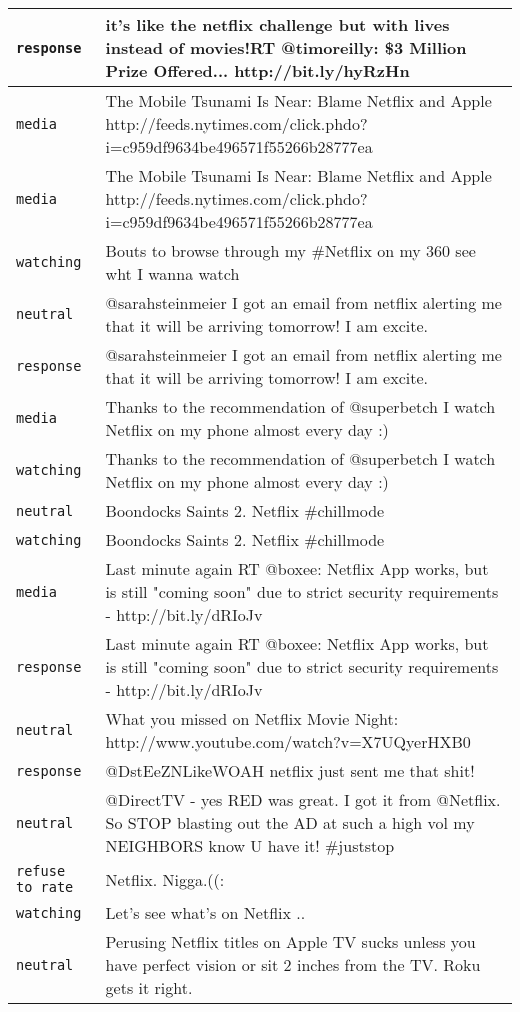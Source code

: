 \begin{center}
\begin{longtable}{|l|p{120mm}|}
      \tabularnewline\hline
         \texttt{response} & it's like the netflix challenge but with lives instead of movies!RT @timoreilly: \$3 Million Prize Offered... http://bit.ly/hyRzHn
      \tabularnewline\hline
         \texttt{media} & The Mobile Tsunami Is Near: Blame Netflix and Apple http://feeds.nytimes.com/click.phdo?i=c959df9634be496571f55266b28777ea
      \tabularnewline\hline
         \texttt{media} & The Mobile Tsunami Is Near: Blame Netflix and Apple http://feeds.nytimes.com/click.phdo?i=c959df9634be496571f55266b28777ea
      \tabularnewline\hline
         \texttt{watching} & Bouts to browse through my \#Netflix on my 360 see wht I wanna watch
      \tabularnewline\hline
         \texttt{neutral} & @sarahsteinmeier I got an email from netflix alerting me that it will be arriving tomorrow! I am excite.
      \tabularnewline\hline
         \texttt{response} & @sarahsteinmeier I got an email from netflix alerting me that it will be arriving tomorrow! I am excite.
      \tabularnewline\hline
         \texttt{media} & Thanks to the recommendation of @superbetch I watch Netflix on my phone almost every day :)
      \tabularnewline\hline
         \texttt{watching} & Thanks to the recommendation of @superbetch I watch Netflix on my phone almost every day :)
      \tabularnewline\hline
         \texttt{neutral} & Boondocks Saints 2. Netflix \#chillmode
      \tabularnewline\hline
         \texttt{watching} & Boondocks Saints 2. Netflix \#chillmode
      \tabularnewline\hline
         \texttt{media} & Last minute again RT @boxee: Netflix App works, but is still "coming soon" due to strict security requirements - http://bit.ly/dRIoJv
      \tabularnewline\hline
         \texttt{response} & Last minute again RT @boxee: Netflix App works, but is still "coming soon" due to strict security requirements - http://bit.ly/dRIoJv
      \tabularnewline\hline
         \texttt{neutral} & What you missed on Netflix Movie Night: http://www.youtube.com/watch?v=X7UQyerHXB0
      \tabularnewline\hline
         \texttt{response} & @DstEeZNLikeWOAH netflix just sent me that shit!
      \tabularnewline\hline
         \texttt{neutral} & @DirectTV - yes RED was great. I got it from @Netflix. So STOP blasting out the AD at such a high vol my NEIGHBORS know U have it! \#juststop
      \tabularnewline\hline
         \texttt{refuse to rate} & Netflix. Nigga.((:
      \tabularnewline\hline
         \texttt{watching} & Let's see what's on Netflix ..
      \tabularnewline\hline
         \texttt{neutral} & Perusing Netflix titles on Apple TV sucks unless you have perfect vision or sit 2 inches from the TV. Roku gets it right.

\end{longtable}
\end{center}
